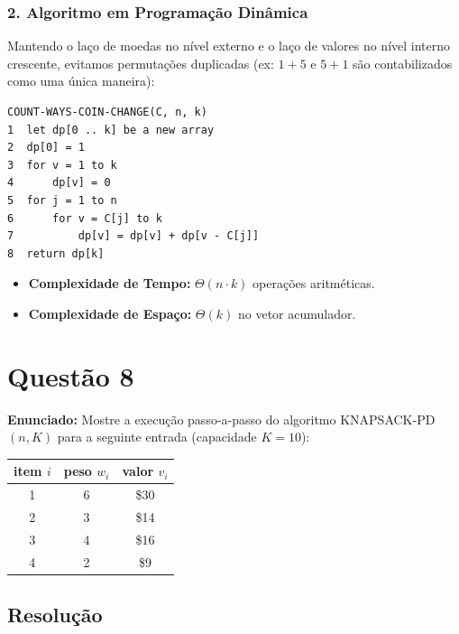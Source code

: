 \documentclass[11pt,a4paper]{article}
\begin{document}
\subsubsection*{2. Algoritmo em Programação Dinâmica}
Mantendo o laço de moedas no nível externo e o laço de valores no nível interno crescente, evitamos permutações duplicadas (ex: $1+5$ e $5+1$ são contabilizados como uma única maneira):

\begin{lstlisting}
COUNT-WAYS-COIN-CHANGE(C, n, k)
1  let dp[0 .. k] be a new array
2  dp[0] = 1
3  for v = 1 to k
4      dp[v] = 0
5  for j = 1 to n
6      for v = C[j] to k
7          dp[v] = dp[v] + dp[v - C[j]]
8  return dp[k]
\end{lstlisting}

\begin{itemize}
    \item \textbf{Complexidade de Tempo:} $\Theta(n \cdot k)$ operações aritméticas.
    \item \textbf{Complexidade de Espaço:} $\Theta(k)$ no vetor acumulador.
\end{itemize}

\vspace{0.4cm}

\section*{Questão 8}
\textbf{Enunciado:} Mostre a execução passo-a-passo do algoritmo \textsc{KNAPSACK-PD}$(n, K)$ para a seguinte entrada (capacidade $K = 10$):
\begin{center}
\begin{tabular}{c|cc}
\toprule
\textbf{item} $i$ & \textbf{peso} $w_i$ & \textbf{valor} $v_i$ \\
\midrule
1 & 6 & \$30 \\
2 & 3 & \$14 \\
3 & 4 & \$16 \\
4 & 2 & \$9 \\
\bottomrule
\end{tabular}
\end{center}

\subsection*{Resolução}
\end{document}
